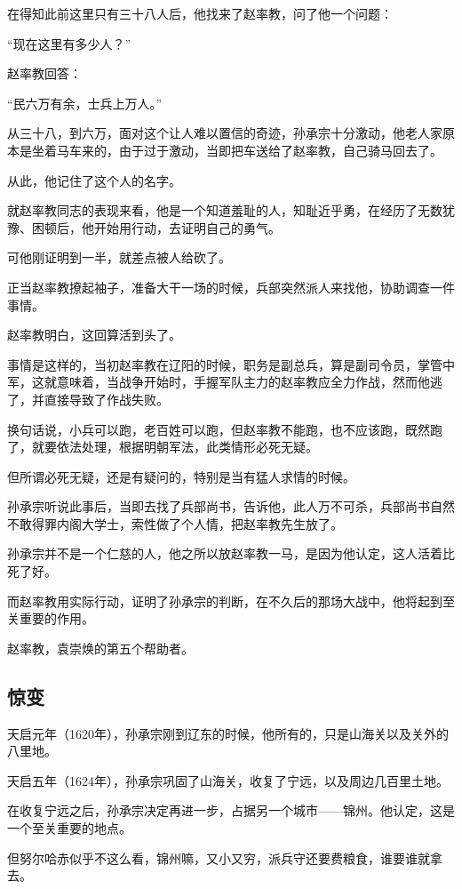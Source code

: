 \begin{multicols}{\theparacolNo}
		在得知此前这里只有三十八人后，他找来了赵率教，问了他一个问题：

		“现在这里有多少人？”

		赵率教回答：

		“民六万有余，士兵上万人。”

		从三十八，到六万，面对这个让人难以置信的奇迹，孙承宗十分激动，他老人家原本是坐着马车来的，由于过于激动，当即把车送给了赵率教，自己骑马回去了。

		从此，他记住了这个人的名字。

		就赵率教同志的表现来看，他是一个知道羞耻的人，知耻近乎勇，在经历了无数犹豫、困顿后，他开始用行动，去证明自己的勇气。

		可他刚证明到一半，就差点被人给砍了。

		正当赵率教撩起袖子，准备大干一场的时候，兵部突然派人来找他，协助调查一件事情。

		赵率教明白，这回算活到头了。

		事情是这样的，当初赵率教在辽阳的时候，职务是副总兵，算是副司令员，掌管中军，这就意味着，当战争开始时，手握军队主力的赵率教应全力作战，然而他逃了，并直接导致了作战失败。

		换句话说，小兵可以跑，老百姓可以跑，但赵率教不能跑，也不应该跑，既然跑了，就要依法处理，根据明朝军法，此类情形必死无疑。

		但所谓必死无疑，还是有疑问的，特别是当有猛人求情的时候。

		孙承宗听说此事后，当即去找了兵部尚书，告诉他，此人万不可杀，兵部尚书自然不敢得罪内阁大学士，索性做了个人情，把赵率教先生放了。

		孙承宗并不是一个仁慈的人，他之所以放赵率教一马，是因为他认定，这人活着比死了好。

		而赵率教用实际行动，证明了孙承宗的判断，在不久后的那场大战中，他将起到至关重要的作用。

		赵率教，袁崇焕的第五个帮助者。

		\subsection{惊变}
		天启元年（1620年），孙承宗刚到辽东的时候，他所有的，只是山海关以及关外的八里地。

		天启五年（1624年），孙承宗巩固了山海关，收复了宁远，以及周边几百里土地。

		在收复宁远之后，孙承宗决定再进一步，占据另一个城市——锦州。他认定，这是一个至关重要的地点。

		但努尔哈赤似乎不这么看，锦州嘛，又小又穷，派兵守还要费粮食，谁要谁就拿去。


\end{multicols}
